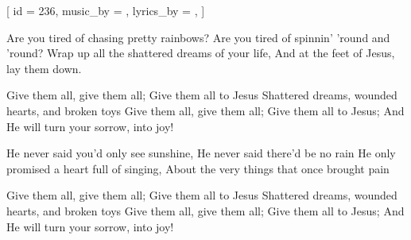 
[
    id                  = {236},
    music_by            = {},
    lyrics_by           = {},
]


\beginverse

Are you tired of chasing pretty rainbows?
Are you tired of spinnin' 'round and 'round?
Wrap up all the shattered dreams of your life,
And at the feet of Jesus, lay them down.

\endverse


\beginchorus
Give them all, give them all; 
Give them all to Jesus
Shattered dreams, wounded hearts, and broken toys
Give them all, give them all; 
Give them all to Jesus;
And He will turn your sorrow, into joy!
\endchorus


\beginverse

He never said you’d only see sunshine,
He never said there’d be no rain
He only promised a heart full of singing,
About the very things that once brought pain

\endverse


\beginchorus
Give them all, give them all; 
Give them all to Jesus
Shattered dreams, wounded hearts, and broken toys
Give them all, give them all; 
Give them all to Jesus;
And He will turn your sorrow, into joy!
\endchorus


\endsong
